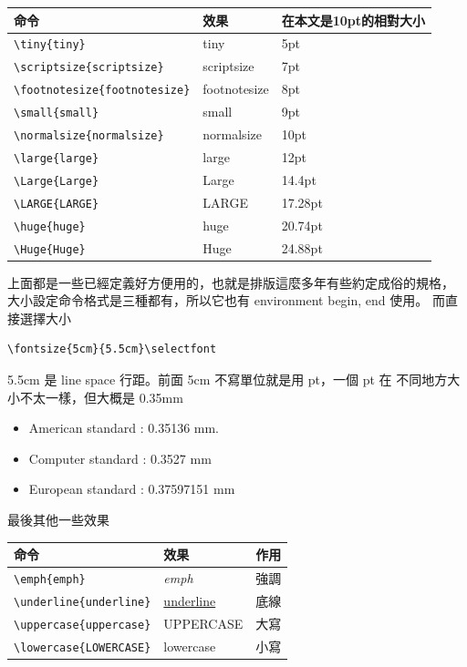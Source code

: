\begin{center}
\begin{tabular}[t]{lll}
命令 & 效果 & 在本文是10pt的相對大小 \\
\hline
\hline
\verb=\tiny{tiny}= & \tiny{tiny} & 5pt \\
\verb=\scriptsize{scriptsize}= & \scriptsize{scriptsize} & 7pt \\
\verb=\footnotesize{footnotesize}= & \footnotesize{footnotesize} & 8pt \\
\verb=\small{small}= & \small{small} & 9pt \\
\verb=\normalsize{normalsize}= & \normalsize{normalsize} & 10pt \\
\verb=\large{large}= & \large{large} & 12pt \\
\verb=\Large{Large}= & \Large{Large} & 14.4pt \\
\verb=\LARGE{LARGE}= & \LARGE{LARGE} & 17.28pt \\
\verb=\huge{huge}= & \huge{huge} & 20.74pt \\
\verb=\Huge{Huge}= & \Huge{Huge} & 24.88pt \\
\end{tabular}
\end{center}
上面都是一些已經定義好方便用的，也就是排版這麼多年有些約定成俗的規格，
大小設定命令格式是三種都有，所以它也有 environment begin, end 使用。
而直接選擇大小
\begin{verbatim}
\fontsize{5cm}{5.5cm}\selectfont
\end{verbatim}
5.5cm 是 line space 行距。前面 5cm 不寫單位就是用 pt，一個 pt 在
不同地方大小不太一樣，但大概是 0.35mm
\begin{itemize}
\item American standard : 0.35136 mm. 
\item Computer standard : 0.3527 mm 
\item European standard : 0.37597151 mm
\end{itemize}

最後其他一些效果

\begin{center}
\begin{tabular}[t]{lll}
命令 & 效果 & 作用 \\
\hline
\hline
\verb=\emph{emph}= & \emph{emph} & 強調 \\
\verb=\underline{underline}= & \underline{underline} & 底線  \\
\verb=\uppercase{uppercase}= & \uppercase{uppercase} & 大寫  \\
\verb=\lowercase{LOWERCASE}= & \lowercase{LOWERCASE} & 小寫  \\
\end{tabular}
\end{center}

